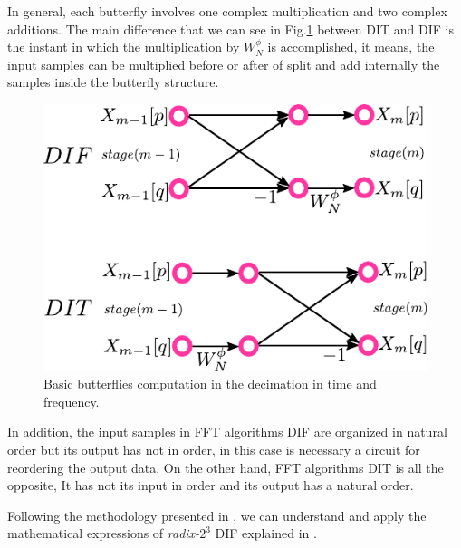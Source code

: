 \documentclass[journal,comsoc]{IEEEtran}
\begin{document}
In general, each butterfly involves one complex multiplication and two complex additions. The main difference that we can see in Fig.\ref{fig:difdit} between DIT and DIF is the instant in which the multiplication by $W_N^\phi$ is accomplished, it means, the input samples can be multiplied before or after of split and add internally the samples inside the butterfly structure.
\begin{figure}[h!]%
	\centering
	\includegraphics[width=0.65\linewidth]{Diagramas/miSeccionFiguras/DifDit}
	\caption{Basic butterflies computation in the decimation in time and frequency.}
	\label{fig:difdit}
\end{figure}

In addition, the input samples in FFT algorithms DIF are organized in natural order but its output has not in order, in this case is necessary a circuit for reordering the output data. On the other hand, FFT algorithms DIT is all the  opposite, It has not its input in order and its output has a natural order.

Following the methodology presented in \cite{proakis_digital_nodate}, we can understand and apply the mathematical expressions of \textit{radix-}$2^3$ DIF explained in \cite{jia_efficient_nodate}. 
\end{document}
